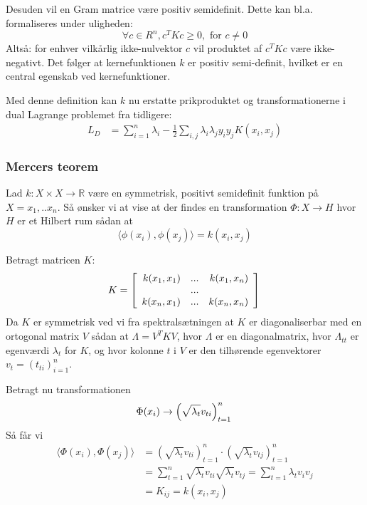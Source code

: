 \documentclass{article}
\begin{document}
Desuden vil en Gram matrice være positiv semidefinit. Dette kan bl.a. formaliseres under uligheden:
\begin{equation}
\forall c\in R^n,c^TKc\geq 0,\text{ for }c\neq 0
\end{equation}
Altså: for enhver vilkårlig ikke-nulvektor $c$ vil produktet af $c^TKc$ være ikke-negativt. Det følger at kernefunktionen $k$ er positiv semi-definit, hvilket er en central egenskab ved kernefunktioner.

Med denne definition kan $k$ nu erstatte prikproduktet og transformationerne i dual Lagrange problemet fra tidligere:
\begin{align*}
L_D&=\sum_{i=1}^{n}\lambda_i-\frac{1}{2}\sum_{i,j}\lambda_i\lambda_j y_iy_jK(x_i,x_j)
\end{align*}


\subsubsection{Mercers teorem}
Lad $k:X\times X\rightarrow \mathbb{R}$ være en symmetrisk, positivt semidefinit funktion på $X={x_1,..x_n}$. Så ønsker vi at vise at der findes en transformation $\Phi:X\rightarrow H$ hvor $H$ er et Hilbert rum sådan at 
\begin{equation}
\langle\phi(x_i),\phi(x_j)\rangle=k(x_i,x_j)
\end{equation}

Betragt matricen $K:$
\begin{equation}
K=\left[\begin{array}{r r r}
k(x_1,x_1) & ... &k(x_1,x_n)\\
& ... & \\
k(x_n,x_1) & ... &k(x_n,x_n)\\
\end{array}\right]\\
\end{equation}
Da $K$ er symmetrisk ved vi fra spektralsætningen at $K$ er diagonaliserbar med en ortogonal matrix $V$ sådan at $\Lambda=V^TKV$, hvor $\Lambda$ er en diagonalmatrix, hvor $\Lambda_{tt}$ er egenværdi $\lambda_t$ for $K$, og hvor kolonne $t$ i $V$ er den tilhørende egenvektorer $v_t=(t_{ti})_{i=1}^n$.

Betragt nu transformationen 
\begin{equation}
\Phi(x_i)\rightarrow\left(\sqrt{\lambda_t}v_{ti}\right)_{t=1}^n\\
\end{equation}
Så får vi
\begin{align}
\langle\Phi(x_i),\Phi(x_j)\rangle&=\left(\sqrt{\lambda_t}v_{ti}\right)_{t=1}^n\cdot\left(\sqrt{\lambda_t}v_{tj}\right)_{t=1}^n\\
&=\sum_{t=1}^n\sqrt{\lambda_t}v_{ti}\sqrt{\lambda_t}v_{tj}=\sum_{t=1}^{n}\lambda_tv_iv_j\\
&=K_{ij}=k(x_i,x_j)
\end{align}
\end{document}
